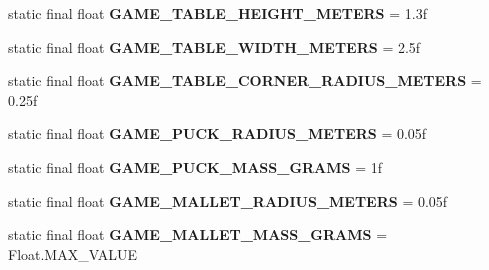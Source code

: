\begin{DoxyCompactItemize}
\item 
\hypertarget{classairhockeyjava_1_1game_1_1_constants_aa9cc3caaa7b0dfc100b0af71981e16c7}{}static final float {\bfseries G\+A\+M\+E\+\_\+\+T\+A\+B\+L\+E\+\_\+\+H\+E\+I\+G\+H\+T\+\_\+\+M\+E\+T\+E\+R\+S} = 1.\+3f\label{classairhockeyjava_1_1game_1_1_constants_aa9cc3caaa7b0dfc100b0af71981e16c7}

\item 
\hypertarget{classairhockeyjava_1_1game_1_1_constants_ac32d1c24fe437047d0ed5e4812e46dad}{}static final float {\bfseries G\+A\+M\+E\+\_\+\+T\+A\+B\+L\+E\+\_\+\+W\+I\+D\+T\+H\+\_\+\+M\+E\+T\+E\+R\+S} = 2.\+5f\label{classairhockeyjava_1_1game_1_1_constants_ac32d1c24fe437047d0ed5e4812e46dad}

\item 
\hypertarget{classairhockeyjava_1_1game_1_1_constants_a7b2efea1095b9cfae44439db9f1398f2}{}static final float {\bfseries G\+A\+M\+E\+\_\+\+T\+A\+B\+L\+E\+\_\+\+C\+O\+R\+N\+E\+R\+\_\+\+R\+A\+D\+I\+U\+S\+\_\+\+M\+E\+T\+E\+R\+S} = 0.\+25f\label{classairhockeyjava_1_1game_1_1_constants_a7b2efea1095b9cfae44439db9f1398f2}

\item 
\hypertarget{classairhockeyjava_1_1game_1_1_constants_a611eb08741eb00d75e3a8bc738d2ec59}{}static final float {\bfseries G\+A\+M\+E\+\_\+\+P\+U\+C\+K\+\_\+\+R\+A\+D\+I\+U\+S\+\_\+\+M\+E\+T\+E\+R\+S} = 0.\+05f\label{classairhockeyjava_1_1game_1_1_constants_a611eb08741eb00d75e3a8bc738d2ec59}

\item 
\hypertarget{classairhockeyjava_1_1game_1_1_constants_abdf79c070f0333669dd464652b4ae4fe}{}static final float {\bfseries G\+A\+M\+E\+\_\+\+P\+U\+C\+K\+\_\+\+M\+A\+S\+S\+\_\+\+G\+R\+A\+M\+S} = 1f\label{classairhockeyjava_1_1game_1_1_constants_abdf79c070f0333669dd464652b4ae4fe}

\item 
\hypertarget{classairhockeyjava_1_1game_1_1_constants_a16f6631beb6f0d576e73446a2891dfef}{}static final float {\bfseries G\+A\+M\+E\+\_\+\+M\+A\+L\+L\+E\+T\+\_\+\+R\+A\+D\+I\+U\+S\+\_\+\+M\+E\+T\+E\+R\+S} = 0.\+05f\label{classairhockeyjava_1_1game_1_1_constants_a16f6631beb6f0d576e73446a2891dfef}

\item 
\hypertarget{classairhockeyjava_1_1game_1_1_constants_a98f0dd461031aaa0418a3e1e12d1fa9b}{}static final float {\bfseries G\+A\+M\+E\+\_\+\+M\+A\+L\+L\+E\+T\+\_\+\+M\+A\+S\+S\+\_\+\+G\+R\+A\+M\+S} = Float.\+M\+A\+X\+\_\+\+V\+A\+L\+U\+E\label{classairhockeyjava_1_1game_1_1_constants_a98f0dd461031aaa0418a3e1e12d1fa9b}


\end{DoxyCompactItemize}
